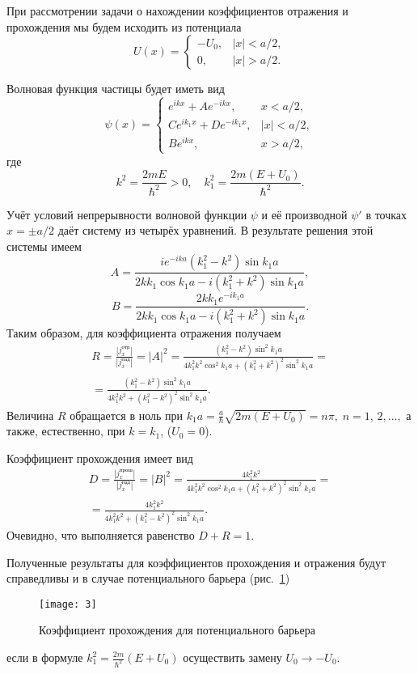 \documentclass[a4paper]{article}
\begin{document}
\begin{sol}
		При рассмотрении задачи о нахождении коэффициентов отражения
и прохождения мы будем исходить из потенциала
\[
	U(x)= \begin{cases}
		-U_0,& |x|<a /2,\\
		0,& |x|
		>a /2.
	\end{cases}
\]

Волновая функция частицы будет иметь вид
\[
	\psi(x)= 
	\begin{cases}
		e^{ikx}+ A e^{-ikx},& x< a /2,\\
		C e^{i k_1 x}+ D e^{- i k_1 x},& |x|< a /2,\\
		Be^{ikx},& x>a /2,
	\end{cases}
\] 
где
\[
	k^2= \frac{2mE}{\hbar^2}>0,\quad k_1^2 = \frac{2 m (E+U_0)}{\hbar^2}
.\] 

Учёт условий непрерывности волновой функции $\psi$ и её производной
$\psi'$ в точках $x=\pm a /2$ даёт систему из четырёх уравнений.
В результате решения этой системы имеем
\[
	A= \frac{i e^{-ika}\left( k_1^2-k^2 \right) \sin k_1a}{
	2kk_1 \cos k_1 a - i \left( k_1^2 +k^2 \right) \sin k_1 a}
 ,\] 
\[
	B= \frac{2 k k_1 e^{-i k_1 a}}{2 k k_1 \cos k_1 a- i \left( 
	k_1^2+k^2\right) \sin k_1 a}
.\] 
Таким образом, для коэффициента отражения получаем
\begin{multline*}
R= \frac{|j_x^\text{отр}|}{|j_x^\text{пад}|}= |A|^2=
\frac{\left(k_1^2-k^2\right)\sin^2 k_1 a}{4 k_1^2 k^2 \cos^2 k_1 a+
\left( k_1^2+k^2 \right) ^2 \sin^2 k_1 a}=\\= \frac{
\left( k_1^2-k^2 \right)\sin^2 k_1 a }{4k_1^2 k^2 + \left( 
k_1^2-k^2\right) ^2 \sin^2 k_1 a}
.\end{multline*} 
Величина $R$ обращается в ноль при $k_1 a = \frac{a}{\hbar }\sqrt{
2 m (E+U_0)} =n \pi,\; n= 1,\,2,\ldots,$ а также, естественно, при
$k=k_1$, ($U_0=0$).

Коэффициент прохождения имеет вид
\begin{multline*}
D= \frac{|j_x^\text{прош}|}{|j_x^\text{пад}|}= |B|^2=
\frac{4k_1^2 k^2}{4 k_1^2 k^2 \cos^2 k_1 a +\left( k_1^2+
k^2\right) ^2 \sin^2 k_1 a}=\\= \frac{4 k_1^2 k^2}{4 k_1^2 k^2+
\left( k_1^2 -k^2 \right) ^2 \sin^2 k_1 a}
.\end{multline*} 
Очевидно, что выполняется равенство $D+R=1$.

Полученные результаты для коэффициентов прохождения и отражения
будут справедливы и в случае потенциального барьера (рис.~\ref{fig:3})
\begin{figure}[htpb]
	\centering
	\texttt{[image: 3]}
	\caption{Коэффициент прохождения для потенциального барьера}
	\label{fig:3}
\end{figure}
если в формуле $k_1^2= \frac{2m}{\hbar^2}(E+U_0)$ осуществить замену
$U_0\to -U_0$.


\end{sol}
\end{document}

